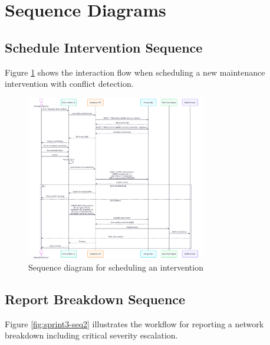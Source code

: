 \section{Sequence Diagrams}

\subsection{Schedule Intervention Sequence}

Figure \ref{fig:sprint3-seq1} shows the interaction flow when scheduling a new maintenance intervention with conflict detection.

\begin{figure}[H]
\centering
\includegraphics[width=0.7\textwidth]{img/chap_05/sprint3_sequence_intervention.png}
\caption{Sequence diagram for scheduling an intervention}
\label{fig:sprint3-seq1}
\end{figure}

\subsection{Report Breakdown Sequence}

Figure \ref{fig:sprint3-seq2} illustrates the workflow for reporting a network breakdown including critical severity escalation.


